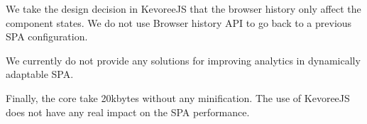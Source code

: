 \begin{description}
\item We take the design decision in KevoreeJS that the browser history only affect the component states. We do not use Browser history API to go back to a previous SPA configuration. 

\item We currently do not provide any solutions for improving analytics in dynamically adaptable SPA.   

\item Finally, the core take 20kbytes without any minification. The use of KevoreeJS does not have any real impact on the SPA performance.

\end{description}
